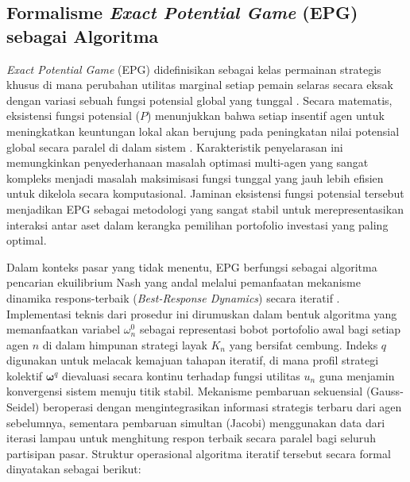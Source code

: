 \subsection{Formalisme \textit{Exact Potential Game} (EPG) sebagai Algoritma}
\textit{Exact Potential Game} (EPG) didefinisikan sebagai kelas permainan strategis khusus di mana perubahan utilitas marginal setiap pemain selaras secara eksak dengan variasi sebuah fungsi potensial global yang tunggal \cite{monderer_potential_1996}. Secara matematis, eksistensi fungsi potensial ($P$) menunjukkan bahwa setiap insentif agen untuk meningkatkan keuntungan lokal akan berujung pada peningkatan nilai potensial global secara paralel di dalam sistem \cite{jain_multi-portfolio_2012}. Karakteristik penyelarasan ini memungkinkan penyederhanaan masalah optimasi multi-agen yang sangat kompleks menjadi masalah maksimisasi fungsi tunggal yang jauh lebih efisien untuk dikelola secara komputasional. Jaminan eksistensi fungsi potensial tersebut menjadikan EPG sebagai metodologi yang sangat stabil untuk merepresentasikan interaksi antar aset dalam kerangka pemilihan portofolio investasi yang paling optimal.

Dalam konteks pasar yang tidak menentu, EPG berfungsi sebagai algoritma pencarian ekuilibrium Nash yang andal melalui pemanfaatan mekanisme dinamika respons-terbaik (\textit{Best-Response Dynamics}) secara iteratif \cite{jain_multi-portfolio_2012}. Implementasi teknis dari prosedur ini dirumuskan dalam bentuk algoritma yang memanfaatkan variabel $\omega_n^0$ sebagai representasi bobot portofolio awal bagi setiap agen $n$ di dalam himpunan strategi layak $K_n$ yang bersifat cembung. Indeks $q$ digunakan untuk melacak kemajuan tahapan iteratif, di mana profil strategi kolektif $\mathbf{\omega}^q$ dievaluasi secara kontinu terhadap fungsi utilitas $u_n$ guna menjamin konvergensi sistem menuju titik stabil. Mekanisme pembaruan sekuensial (Gauss-Seidel) beroperasi dengan mengintegrasikan informasi strategis terbaru dari agen sebelumnya, sementara pembaruan simultan (Jacobi) menggunakan data dari iterasi lampau untuk menghitung respon terbaik secara paralel bagi seluruh partisipan pasar. Struktur operasional algoritma iteratif tersebut secara formal dinyatakan sebagai berikut:


